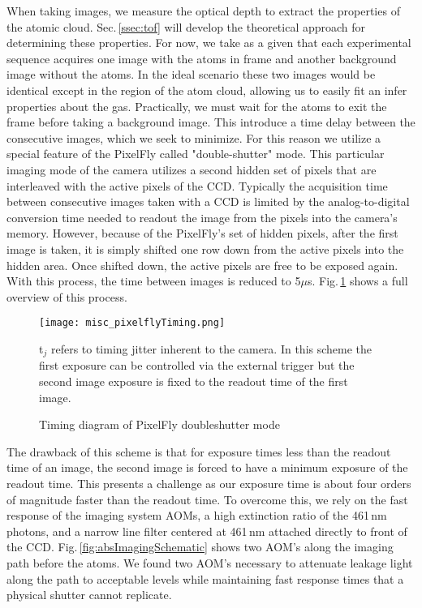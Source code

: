 When taking images, we measure the optical depth to extract the properties of the atomic cloud.
Sec.\,\ref{ssec:tof} will develop the theoretical approach for determining these properties.
For now, we take as a given that each experimental sequence acquires one image with the atoms in frame and another background image without the atoms.
In the ideal scenario these two images would be identical except in the region of the atom cloud, allowing us to easily fit an infer properties about the gas.
Practically, we must wait for the atoms to exit the frame before taking a background image.
This introduce a time delay between the consecutive images, which we seek to minimize.
For this reason we utilize a special feature of the PixelFly called "double-shutter" mode.
This particular imaging mode of the camera utilizes a second hidden set of pixels that are interleaved with the active pixels of the CCD.
Typically the acquisition time between consecutive images taken with a CCD is limited by the analog-to-digital conversion time needed to readout the image from the pixels into the camera's memory.
However, because of the PixelFly's set of hidden pixels, after the first image is taken, it is simply shifted one row down from the active pixels into the hidden area.
Once shifted down, the active pixels are free to be exposed again.
With this process, the time between images is reduced to 5$\mu$s.
Fig.\,\ref{fig:pixelflyTiming} shows a full overview of this process.
	\begin{figure} 
		\centerline{
		\texttt{[image: misc\_pixelflyTiming.png]}}
		\caption{Timing diagram of PixelFly doubleshutter mode}{t$_j$ refers to timing jitter inherent to the camera. In this scheme the first exposure can be controlled via the external trigger but the second image exposure is fixed to the readout time of the first image.}
		\label{fig:pixelflyTiming}
	\end{figure}
The drawback of this scheme is that for exposure times less than the readout time of an image, the second image is forced to have a minimum exposure of the readout time.
This presents a challenge as our exposure time is about four orders of magnitude faster than the readout time.
To overcome this, we rely on the fast response of the imaging system AOMs, a high extinction ratio of the 461\,nm photons, and a narrow line filter centered at 461\,nm attached directly to front of the CCD.
Fig.\,\ref{fig:absImagingSchematic} shows two AOM's along the imaging path before the atoms.
We found two AOM's necessary to attenuate leakage light along the path to acceptable levels while maintaining fast response times that a physical shutter cannot replicate.

